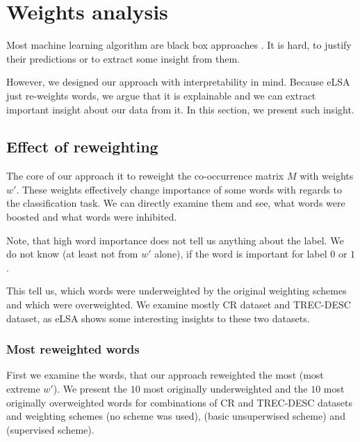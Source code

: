 \section{Weights analysis} \label{chap:weight:analysis}

    Most machine learning algorithm are black box approaches \cite{ribeiro2016should}. %
    It is hard, to justify their predictions or to extract some insight from them. 
    
    However, we designed our approach with interpretability in mind.
    Because eLSA just re-weights words, we argue that it is explainable and we can extract important insight about our data from it.
    In this section, we present such insight.
    
    \subsection{Effect of reweighting}
    The core of our approach it to reweight the co-occurrence matrix $M$ with weights $w'$. 
    These weights effectively change importance of some words with regards to the classification task.
    We can directly examine them and see, what words were boosted and what words were inhibited.
    
    Note, that high word importance does not tell us anything about the label. 
    We do not know (at least not from $w'$ alone), if the word is important for label $0$ or $1$.
    
    This tell us, which words were underweighted by the original weighting schemes and which were overweighted.
    We examine mostly CR dataset and TREC-DESC dataset, as eLSA shows some interesting insights to these two datasets.

    \subsubsection{Most reweighted words}
    
    First we examine the words, that our approach reweighted the most (most extreme $w'$).
    We present the $10$ most originally underweighted and the $10$ most originally overweighted words for combinations of CR and TREC-DESC datasets and weighting schemes  (no scheme was used),  (basic unsuperwised scheme) and  (supervised scheme).
    

